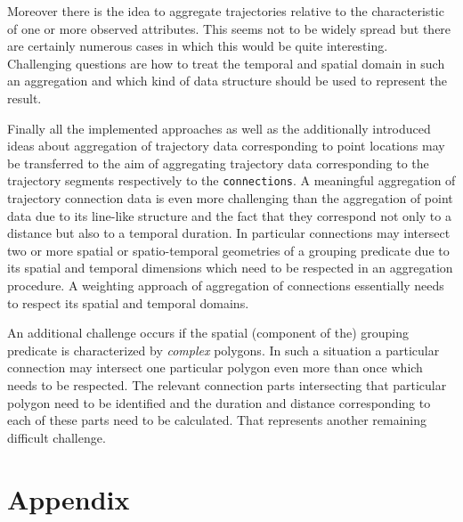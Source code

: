 \documentclass[12pt, oneside, a4paper]{scrbook}
\let\code=\texttt
\begin{document}
Moreover there is the idea to aggregate trajectories relative to the characteristic of one or more observed attributes. 
This seems not to be widely spread but there are certainly numerous cases in which this would be quite interesting.
Challenging questions are how to treat the temporal and spatial domain in such an aggregation and which kind of data structure should be used to represent the result.
\par\medskip

Finally all the implemented approaches as well as the additionally introduced ideas about aggregation of trajectory data corresponding to point locations may be transferred to the aim of aggregating trajectory data corresponding to the trajectory segments respectively to the \code{connections}. 
A meaningful aggregation of trajectory connection data is even more challenging than the aggregation of point data due to its line-like structure and the fact that they correspond not only to a distance but also to a temporal duration.
In particular connections may intersect two or more spatial or spatio-temporal geometries of a grouping predicate due to its spatial and temporal dimensions which need to be respected in an aggregation procedure.
A weighting approach of aggregation of connections essentially needs to respect its spatial and temporal domains.
\par\medskip

An additional challenge occurs if the spatial (component of the) grouping predicate is characterized by \textit{complex} polygons.
In such a situation a particular connection may intersect one particular polygon even more than once which needs to be respected.
The relevant connection parts intersecting that particular polygon need to be identified and the duration and distance corresponding to each of these parts need to be calculated.
That represents another remaining difficult challenge.
\clearpage









\appendix

\chapter{Appendix}
\end{document}
